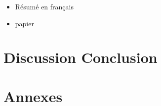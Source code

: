 \documentclass[a4paper,12pt,notitlepage,twoside]{report}
\numberwithin{equation}{section}
\begin{document}
\begin{itemize}
\item Résumé en français
\item papier
\end{itemize}




\chapter*{Discussion Conclusion}

\chapter*{Annexes}


\listoffigures

\listoftables




\end{document}
